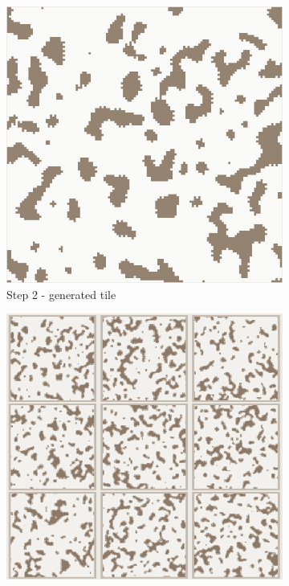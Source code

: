 \documentclass[12pt]{report}
\begin{document}
\begin{figure}[h]
\begin{subfigure}[b]{0.2\textwidth}
		\includegraphics[width=\textwidth]{images/step2}
		\caption{Step 2 - generated tile} 
	\end{subfigure}
	\hfill
	\begin{subfigure}[b]{0.2\textwidth}
		\centering
		\includegraphics[width=\textwidth]{images/step3}

\end{subfigure}
\end{figure}
\end{document}
